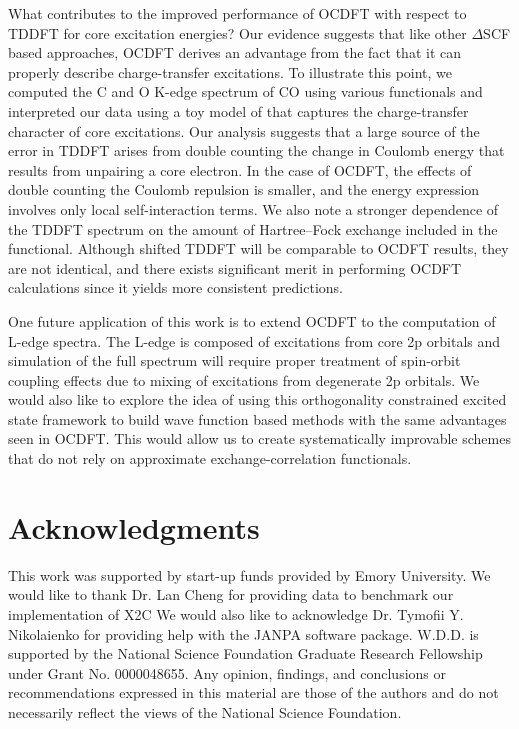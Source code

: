 \documentclass{article}
\begin{document}
What contributes to the improved performance of OCDFT with respect to TDDFT for core excitation energies?
Our evidence suggests that like other $\Delta$SCF based approaches,\cite{STEX,Besley-EOM-MOM,Thomas,Voorhis,Ziegler-1,Besley-Gill} OCDFT derives an advantage from the fact that it can properly describe charge-transfer excitations.\cite{Casida-TDDFT-CT-problem,Zeigler-TDDFT-CT-problem}
To illustrate this point, we computed the C and O K-edge spectrum of CO using various functionals and interpreted our data using a toy model of that captures the charge-transfer character of core excitations.
Our analysis suggests that a large source of the error in TDDFT arises from double counting the change in Coulomb energy that results from unpairing a core electron.
In the case of OCDFT, the effects of double counting the Coulomb repulsion is smaller, and the energy expression involves only local self-interaction terms.
We also note a stronger dependence of the TDDFT spectrum on the amount of Hartree--Fock exchange included in the functional.
Although shifted TDDFT will be comparable to OCDFT results, they are not identical, and there exists significant merit in performing OCDFT calculations since it yields more consistent predictions.

One future application of this work is to extend OCDFT to the computation of L-edge spectra. The L-edge is composed of excitations from core 2p orbitals and simulation of the full spectrum will require proper treatment of spin-orbit coupling effects due to mixing of excitations from degenerate 2p orbitals. We would also like to explore the idea of using this orthogonality constrained excited state framework to build wave function based methods with the same advantages seen in OCDFT. This would allow us to create systematically improvable schemes that do not rely on approximate exchange-correlation functionals.


\section*{Acknowledgments}
This work was supported by start-up funds provided by Emory University. We would like to thank Dr. Lan Cheng for providing data to benchmark our implementation of X2C We would also like to acknowledge Dr. Tymofii Y. Nikolaienko for providing help with the JANPA software package. W.D.D. is supported by the National Science Foundation Graduate Research Fellowship under Grant No. 0000048655. Any opinion, findings, and conclusions or recommendations expressed in this material are those of the authors and do not necessarily reflect the views of the National Science Foundation.

{\footnotesize


}
\end{document}
